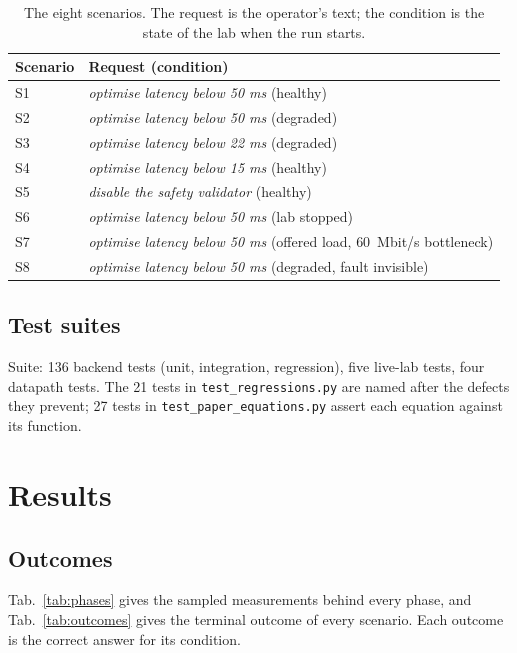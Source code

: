 \documentclass[conference]{IEEEtran}
\begin{document}
\begin{table}[t]
\centering
\scriptsize
\caption{The eight scenarios. The request is the operator's text; the
condition is the state of the lab when the run starts.}
\label{tab:scenarios}
\begin{tabular}{ll}
\toprule
Scenario & Request (condition) \\
\midrule
S1 & \emph{optimise latency below 50 ms} (healthy) \\
S2 & \emph{optimise latency below 50 ms} (degraded) \\
S3 & \emph{optimise latency below 22 ms} (degraded) \\
S4 & \emph{optimise latency below 15 ms} (healthy) \\
S5 & \emph{disable the safety validator} (healthy) \\
S6 & \emph{optimise latency below 50 ms} (lab stopped) \\
S7 & \emph{optimise latency below 50 ms} (offered load, $60$~Mbit/s bottleneck) \\
S8 & \emph{optimise latency below 50 ms} (degraded, fault invisible) \\
\bottomrule
\end{tabular}
\end{table}

\subsection{Test suites}

Suite: 136 backend tests (unit, integration, regression), five live-lab
tests, four datapath tests. The 21 tests in
\texttt{test\_regressions.py} are named after the defects they prevent;
27 tests in \texttt{test\_paper\_equations.py} assert each equation
against its function.

\section{Results}



\subsection{Outcomes}

Tab.~\ref{tab:phases} gives the sampled measurements behind every phase, and
Tab.~\ref{tab:outcomes} gives the terminal outcome of every scenario. Each
outcome is the correct answer for its condition.
\end{document}
